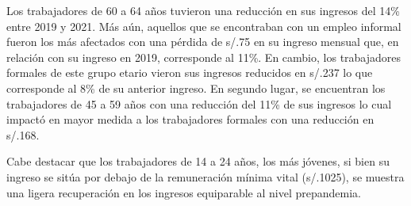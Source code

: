 \documentclass[
  letterpaper,
  12pt,
  oneside,
  spanish,
  doublespacing,
  headsepline,
  parskip]{MastersDoctoralThesis}
\begin{document}
Los trabajadores de 60 a 64 años tuvieron una reducción en sus ingresos
del 14\% entre 2019 y 2021. Más aún, aquellos que se encontraban con un
empleo informal fueron los más afectados con una pérdida de s/.75 en su
ingreso mensual que, en relación con su ingreso en 2019, corresponde al
11\%. En cambio, los trabajadores formales de este grupo etario vieron
sus ingresos reducidos en s/.237 lo que corresponde al 8\% de su
anterior ingreso. En segundo lugar, se encuentran los trabajadores de 45
a 59 años con una reducción del 11\% de sus ingresos lo cual impactó en
mayor medida a los trabajadores formales con una reducción en s/.168.

Cabe destacar que los trabajadores de 14 a 24 años, los más jóvenes, si
bien su ingreso se sitúa por debajo de la remuneración mínima vital
(s/.1025), se muestra una ligera recuperación en los ingresos
equiparable al nivel prepandemia.
\end{document}
